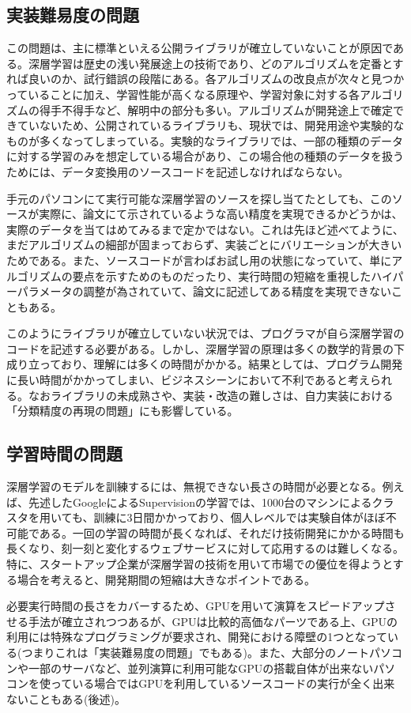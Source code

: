 \subsection{実装難易度の問題}
この問題は、主に標準といえる公開ライブラリが確立していないことが原因である。深層学習は歴史の浅い発展途上の技術であり、どのアルゴリズムを定番とすれば良いのか、試行錯誤の段階にある。各アルゴリズムの改良点が次々と見つかっていることに加え、学習性能が高くなる原理や、学習対象に対する各アルゴリズムの得手不得手など、解明中の部分も多い。アルゴリズムが開発途上で確定できていないため、公開されているライブラリも、現状では、開発用途や実験的なものが多くなってしまっている。実験的なライブラリでは、一部の種類のデータに対する学習のみを想定している場合があり、この場合他の種類のデータを扱うためには、データ変換用のソースコードを記述しなければならない。\par%
手元のパソコンにて実行可能な深層学習のソースを探し当てたとしても、このソースが実際に、論文にて示されているような高い精度を実現できるかどうかは、実際のデータを当てはめてみるまで定かではない。これは先ほど述べてように、まだアルゴリズムの細部が固まっておらず、実装ごとにバリエーションが大きいためである。また、ソースコードが言わばお試し用の状態になっていて、単にアルゴリズムの要点を示すためのものだったり、実行時間の短縮を重視したハイパーパラメータの調整が為されていて、論文に記述してある精度を実現できないこともある。\par
このようにライブラリが確立していない状況では、プログラマが自ら深層学習のコードを記述する必要がある。しかし、深層学習の原理は多くの数学的背景の下成り立っており、理解には多くの時間がかかる。結果としては、プログラム開発に長い時間がかかってしまい、ビジネスシーンにおいて不利であると考えられる。なおライブラリの未成熟さや、実装・改造の難しさは、自力実装における「分類精度の再現の問題」にも影響している。\par

\subsection{学習時間の問題}
深層学習のモデルを訓練するには、無視できない長さの時間が必要となる。例えば、先述したGoogleによるSupervisionの学習では、1000台のマシンによるクラスタを用いても、訓練に3日間かかっており、個人レベルでは実験自体がほぼ不可能である\cite{le2012building}。一回の学習の時間が長くなれば、それだけ技術開発にかかる時間も長くなり、刻一刻と変化するウェブサービスに対して応用するのは難しくなる。特に、スタートアップ企業が深層学習の技術を用いて市場での優位を得ようとする場合を考えると、開発期間の短縮は大きなポイントである\cite{ries2011the-lean}。\par
必要実行時間の長さをカバーするため、GPUを用いて演算をスピードアップさせる手法が確立されつつあるが、GPUは比較的高価なパーツである上、GPUの利用には特殊なプログラミングが要求され、開発における障壁の1つとなっている(つまりこれは「実装難易度の問題」でもある)。また、大部分のノートパソコンや一部のサーバなど、並列演算に利用可能なGPUの搭載自体が出来ないパソコンを使っている場合ではGPUを利用しているソースコードの実行が全く出来ないこともある(後述)。\par


